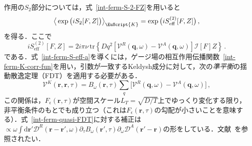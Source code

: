 \documentclass[a4paper,11pt]{ltjsarticle}
\def\tr{\mathrm{tr}}
\def\d{\mathrm{d}}
\def\qo{(\mathbf{q},\omega)}
\begin{document}
作用の$S_2$部分については，式~\eqref{int-ferm-S-2-FZ}を用いると
\begin{equation}
\big\langle\exp\big(iS_{2}[F,Z]\big)\big\rangle_{\EuScript{K}}=
\exp\big(iS^{(2)}_{\mathrm{eff}}[F,Z]\big)\,,
\end{equation}
を得る．ここで
\begin{equation}\label{int-ferm-S-eff-a}
iS^{(2)}_{\mathrm{eff}}[F,Z]=2i\pi\nu\,\tr\left\{Dq^{2}[\mathcal{V}^{R}\qo-
\mathcal{V}^{A}\qo]\mathcal{I}[F]Z\right\}\,.
\end{equation}
である．式~\eqref{int-ferm-S-eff-a}を導くには，ゲージ場の相互作用伝播関数~\eqref{int-ferm-K-corr-fun}を用い，引数が一致するKeldysh成分に対して，次の\textit{準平衡}の揺動散逸定理（FDT）を適用する必要がある．
\begin{equation}\label{int-ferm-quasi-FDT}
\mathcal{V}^{K}(\mathbf{r},\mathbf{r},\tau)=B_{\omega}(\mathbf{r},\tau)
\sum_{q}\big[\mathcal{V}^{R}\qo-\mathcal{V}^{A}\qo\big]\,,
\end{equation}
この関係は，$F_{\epsilon}(\mathbf{r},\tau)$が空間スケール$L_{T}=\sqrt{D/T}$上でゆっくり変化する限り，非平衡条件のもとでも成り立つ（これは$F_{\epsilon}(\mathbf{r},\tau)$の勾配が小さいことを意味する）．式~\eqref{int-ferm-quasi-FDT}に対する補正は$\propto\omega\int\d\mathbf{r}'\mathcal{D}^{R}(\mathbf{r}-\mathbf{r}',\omega)
\partial_{\tau}B_{\omega}(\mathbf{r}',\tau)\partial_{\omega}
\mathcal{D}^{A}(\mathbf{r}'-\mathbf{r})$の形をしている．文献~\cite{KamenevAndreev}を参照されたい．
\end{document}
